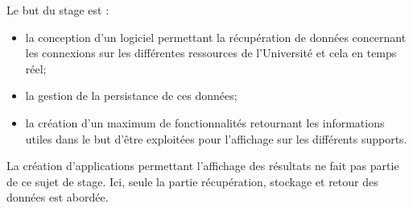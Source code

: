 \noindent Le but du stage est : 

\begin{itemize}
	\item la conception d'un logiciel permettant la r\'ecup\'eration de donn\'ees concernant les connexions sur les diff\'erentes ressources de l'Universit\'e et cela en temps r\'eel;
	\item la gestion de la persistance de ces donn\'ees;
	\item la cr\'eation d'un maximum de fonctionnalit\'es retournant les informations utiles dans le but d'\^etre exploit\'ees pour l'affichage sur les diff\'erents supports.

\end{itemize} 

\vspace{0.20cm}

La cr\'eation d'applications permettant l'affichage des r\'esultats ne fait pas partie de ce sujet de stage. 
Ici, seule la partie r\'ecup\'eration, stockage et retour des donn\'ees est abord\'ee.

\clearpage
